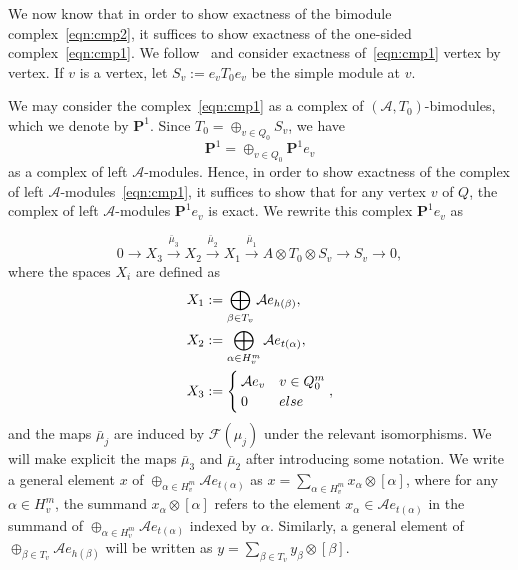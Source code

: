 \documentclass{article}
\theoremstyle{definition}
\newcommand{\A}{{\mathcal A}}
\begin{document}
We now know that in order to show exactness of the bimodule complex~\eqref{eqn:cmp2}, it suffices to show exactness of the one-sided complex~\eqref{eqn:cmp1}.
We follow~\cite[\S3]{XPressland2019} and consider exactness of~\eqref{eqn:cmp1} vertex by vertex.
If $v$ is a vertex, let $S_v:=e_vT_0e_v$ be the simple module at $v$. 


We may consider
the complex~\eqref{eqn:cmp1} as a complex of $(\A,T_0)$-bimodules, which we denote by $\mathbf P^1$. Since $T_0=\oplus_{v\in Q_0}S_v$, we have
\[\mathbf P^1=\oplus_{v\in Q_0}\mathbf P^1e_v\]
as a complex of left $\A$-modules.
Hence, in order to show exactness of the complex of left $\A$-modules~\eqref{eqn:cmp1}, it suffices to show that for any vertex $v$ of $Q$, the complex of left $\A$-modules $\mathbf P^1e_v$ is exact. We rewrite this complex $\mathbf P^1e_v$ as

\begin{equation}
	\label{eqn:cmp4}
	0\to X_3\xrightarrow{\bar\mu_3}X_2\xrightarrow{\bar\mu_2}X_1\xrightarrow{\bar\mu_1}A\otimes T_0\otimes S_v\to S_v\to0,
\end{equation}
where the spaces $X_i$ are defined as
\begin{align*}
	X_1&:=\bigoplus_{\beta\in T_v}\A e_{h(\beta)},\\
	X_2&:=\bigoplus_{\alpha\in H_v^m}\A e_{t(\alpha)},\\
	X_3&:=\begin{cases}
		\A e_v&v\in Q_0^m\\
	0&\textup{else}\end{cases},
\end{align*}
and the maps $\bar\mu_j$ are induced by $\mathcal F(\mu_j)$ under the relevant isomorphisms. We will make explicit the maps $\bar\mu_3$ and $\bar\mu_2$ after introducing some notation. We write a general element $x$ of $\oplus_{\alpha\in H_v^{m}}\A e_{t(\alpha)}$ as $x=\sum_{\alpha\in H_v^{m}}x_\alpha\otimes[\alpha]$, where for any $\alpha\in H_v^{m}$, the summand $x_\alpha\otimes[\alpha]$ refers to the element $x_\alpha\in\A e_{t(\alpha)}$ in the summand of $\oplus_{\alpha\in H_v^{m}}\A e_{t(\alpha)}$ indexed by $\alpha$. Similarly, a general element of $\oplus_{\beta\in T_v}\A e_{h(\beta)}$ will be written as $y=\sum_{\beta\in T_v}y_\beta\otimes[\beta]$.
\end{document}
